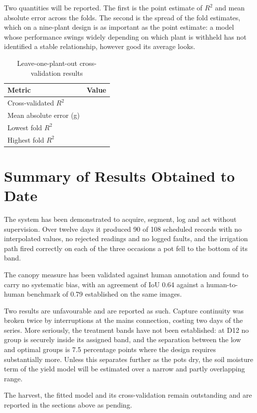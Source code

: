 Two quantities will be reported. The first is the point estimate of $R^2$ and
mean absolute error across the folds. The second is the spread of the fold
estimates, which on a nine-plant design is as important as the point estimate:
a model whose performance swings widely depending on which plant is withheld
has not identified a stable relationship, however good its average looks.

\begin{table}[ht]
\centering
\caption{Leave-one-plant-out cross-validation results}
\label{tab:loocv}
\begin{tabular}{lr}
\toprule
\textbf{Metric} & \textbf{Value} \\
\midrule
Cross-validated $R^2$          & \\
Mean absolute error (g)        & \\
Lowest fold $R^2$              & \\
Highest fold $R^2$             & \\
\bottomrule
\end{tabular}
\end{table}

\section{Summary of Results Obtained to Date}

The system has been demonstrated to acquire, segment, log and act without
supervision. Over twelve days it produced 90 of 108 scheduled records with no
interpolated values, no rejected readings and no logged faults, and the
irrigation path fired correctly on each of the three occasions a pot fell to
the bottom of its band.

The canopy measure has been validated against human annotation and found to
carry no systematic bias, with an agreement of IoU 0.64 against a human-to-human
benchmark of 0.79 established on the same images.

Two results are unfavourable and are reported as such. Capture continuity was
broken twice by interruptions at the mains connection, costing two days of the
series. More seriously, the treatment bands have not been established: at D12
no group is securely inside its assigned band, and the separation between the
low and optimal groups is 7.5 percentage points where the design requires
substantially more. Unless this separates further as the pots dry, the soil
moisture term of the yield model will be estimated over a narrow and partly
overlapping range.

The harvest, the fitted model and its cross-validation remain outstanding and
are reported in the sections above as pending.
